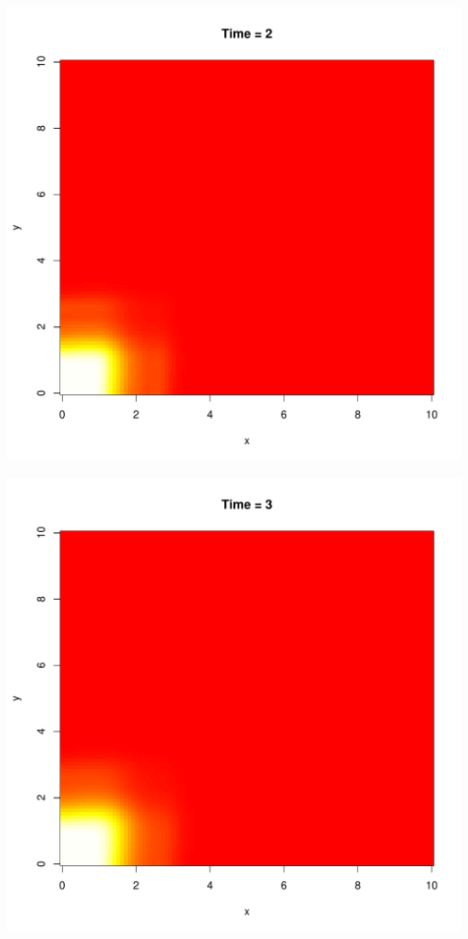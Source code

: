 \documentclass{tufte-handout}\usepackage[]{graphicx}\usepackage[]{xcolor}
\makeatletter
\def\maxwidth{ %
  \ifdim\Gin@nat@width>\linewidth
    \linewidth
  \else
    \Gin@nat@width
  \fi
}
\newenvironment{knitrout}{}{} %
\makeatother
\begin{document}
\begin{knitrout}
\includegraphics[width=\maxwidth]{figure/unnamed-chunk-4-3} 

\includegraphics[width=\maxwidth]{figure/unnamed-chunk-4-4} 


\end{knitrout}
\end{document}
